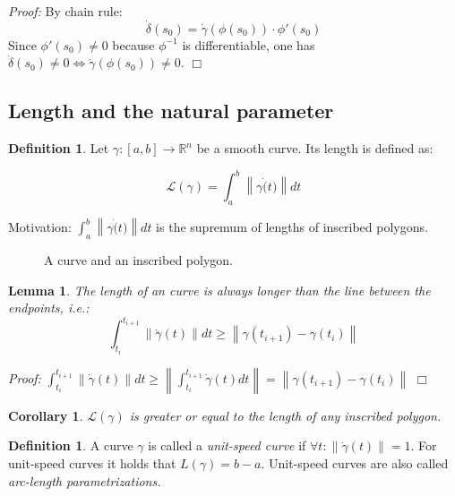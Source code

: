 \documentclass[a4paper,11pt,notitlepage,fullpage]{paper}
\theoremstyle{plain}
\newtheorem{lem}[thm]{Lemma}
\newtheorem{col}[thm]{Corollary}
\theoremstyle{definition}
\newtheorem{defn}[thm]{Definition} %
\begin{document}
\emph{Proof:} By chain rule: 
\begin{equation*}
\dot\delta(s_0) = \dot\gamma(\phi(s_0)) \cdot \phi'(s_0)
\end{equation*}
Since $\phi'(s_0) \neq 0$ because $\phi^{-1}$ is differentiable, one has $\dot\delta(s_0) \neq 0 \Leftrightarrow \dot\gamma(\phi(s_0)) \neq 0$. \hfill $\Box$



\subsection{Length and the natural parameter}

\begin{defn}
Let $\gamma: [a,b] \to \mathbb R^n$ be a smooth curve. Its length is defined as:

\begin{equation*}
\mathcal L(\gamma) = \int_a^b \left\|\gamma\dot(t)\right\| dt
\end{equation*}
\end{defn}

Motivation: $\int_a^b \left\|\gamma\dot(t)\right\| dt $ is the supremum of lengths of inscribed polygons.

\begin{figure}[H]
\centering
\def\svgwidth{0.7\textwidth}

\caption{A curve and an inscribed polygon.}
\label{fig:inscribed-polygon}
\end{figure}


\begin{lem}
The length of an curve is always longer than the line between the endpoints, i.e.:
\begin{equation*}
\int_{t_i}^{t_{i+1}} \left\|\dot\gamma(t)\right\| dt \geq \left\|\gamma(t_{i+1}) - \gamma(t_i)\right\|
\end{equation*}
\end{lem}
\emph{Proof:} $\int_{t_i}^{t_{i+1}} \left\|\dot\gamma(t)\right\| dt \geq \left\|\int_{t_i}^{t_{i+1}} \dot\gamma(t) dt\right\| =  \left\|\gamma(t_{i+1}) - \gamma(t_i)\right\|$ \hfill $\Box$

\begin{col}
$\mathcal L(\gamma)$ is greater or equal to the length of any inscribed polygon.
\end{col}


\begin{defn}
A curve $\gamma$ is called a \emph{unit-speed curve} if $\forall t : \left\|\dot\gamma(t)\right\| = 1$. For unit-speed curves it holds that $L(\gamma) = b-a$. Unit-speed curves are also called \emph{arc-length parametrizations.}
\end{defn}
\end{document}

